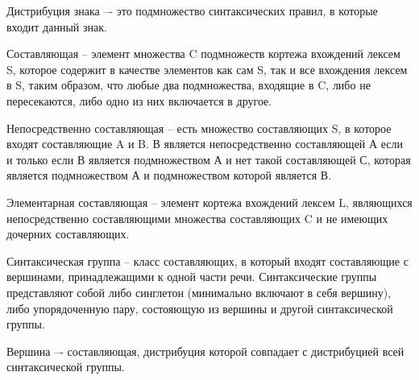 Дистрибуция знака –- это подмножество синтаксических правил, в которые входит данный знак.

Составляющая -- элемент множества C подмножеств кортежа вхождений лексем S, которое содержит в качестве элементов как сам S, так и все вхождения лексем в S, таким образом, что любые два подмножества, входящие в C, либо не пересекаются, либо одно из них включается в другое.

Непосредственно составляющая --  есть множество составляющих S, в которое входят составляющие A и B. В является непосредственно составляющей А если и только если В является подмножеством А и нет такой составляющей С, которая является подмножеством А и подмножеством которой является В.

Элементарная составляющая -- элемент кортежа вхождений лексем L, являющихся непосредственно составляющими множества составляющих C и не имеющих дочерних составляющих.

Синтаксическая группа -- класс составляющих, в который входят составляющие с вершинами, принадлежащими к одной части речи.
Синтаксические группы представляют собой либо синглетон (минимально включают в себя вершину), либо упорядоченную пару, состояющую из вершины и другой синтаксической группы.

Вершина –- составляющая, дистрибуция которой совпадает с дистрибуцией всей синтаксической группы.

